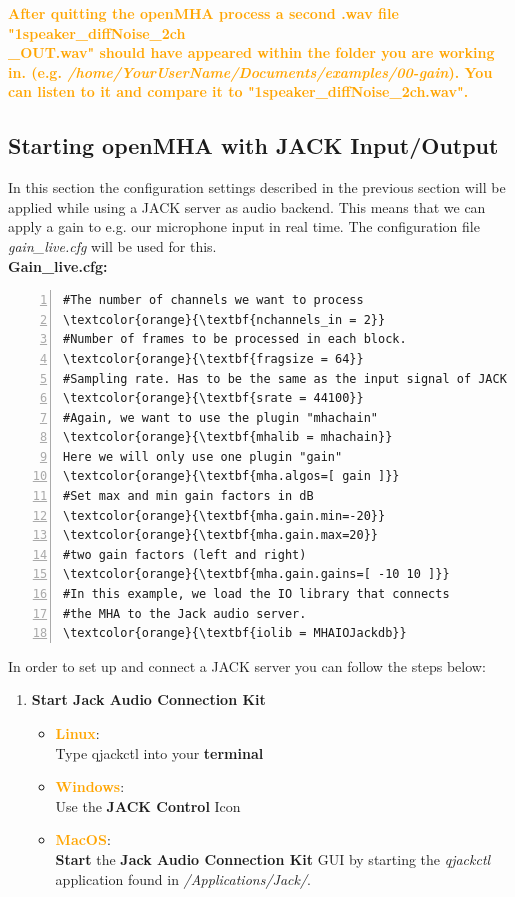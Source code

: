 \documentclass[11pt,a4paper,twoside]{article}
\newcommand{\+}{\discretionary{\mbox{\scriptsize$\hookleftarrow$}}{}{}}
\begin{document}
{{{\textcolor{orange}{\textbf{After quitting the openMHA process a second .wav file "1speaker\_diffNoise\_2ch \\ \_OUT.wav" should have appeared within the folder you are working in. (e.g. \textit{/home/YourUserName/Documents/examples/00-gain}). You can listen to it and compare it to "1speaker\_diffNoise\_2ch.wav".}}

\newpage

\subsection{Starting openMHA with JACK Input/Output}

In this section the configuration settings described in the previous section will be applied while using a JACK server as audio backend. This means that we can apply a gain to e.g. our microphone input in real time. The configuration file {{\ttfamily \textit{gain\_live.cfg}}} will be used for this. \\

\textbf{Gain\_live.cfg:}

\begin{Verbatim}[frame=single,numbers=left,commandchars=\\\{\}]
#The number of channels we want to process
\textcolor{orange}{\textbf{nchannels_in = 2}}
#Number of frames to be processed in each block.
\textcolor{orange}{\textbf{fragsize = 64}}
#Sampling rate. Has to be the same as the input signal of JACK
\textcolor{orange}{\textbf{srate = 44100}}
#Again, we want to use the plugin "mhachain"
\textcolor{orange}{\textbf{mhalib = mhachain}}
Here we will only use one plugin "gain"
\textcolor{orange}{\textbf{mha.algos=[ gain ]}}
#Set max and min gain factors in dB
\textcolor{orange}{\textbf{mha.gain.min=-20}}
\textcolor{orange}{\textbf{mha.gain.max=20}}
#two gain factors (left and right)
\textcolor{orange}{\textbf{mha.gain.gains=[ -10 10 ]}}
#In this example, we load the IO library that connects
#the MHA to the Jack audio server.
\textcolor{orange}{\textbf{iolib = MHAIOJackdb}}
\end{Verbatim} 

In order to set up and connect a JACK server you can follow the steps below:

\begin{enumerate}
    \item \textbf{Start Jack Audio Connection Kit} 
    
    \begin{itemize}
\item \textcolor{orange}{\textbf{Linux}}: \\ Type {\ttfamily qjackctl} into your \textbf{terminal} 
\item \textcolor{orange}{\textbf{Windows}}: \\ Use the \textbf{JACK Control} Icon
\item \textcolor{orange}{\textbf{MacOS}}: \\ \textbf{Start} the \textbf{Jack Audio Connection Kit} GUI by starting the \textit{qjackctl} application found in \textit{/Applications/Jack/}.
\end{itemize}


\end{enumerate}}}}
\end{document}
